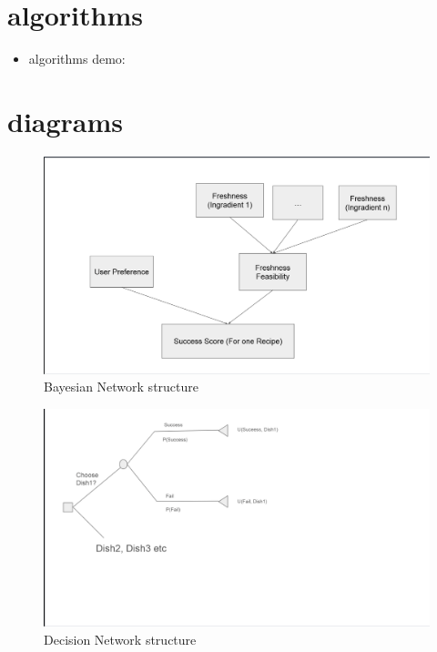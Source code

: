 \section{algorithms}
\begin{itemize}
    \item algorithms demo: 
\end{itemize}
\newpage
\section{diagrams}

\begin{figure}[ht]
    \centering
    \includegraphics[width=1.0\textwidth]{appendix/Image/BN.png}
    \caption{Bayesian Network structure}
    \label{fig:BN}
\end{figure}

\begin{figure}[ht]
    \centering
    \includegraphics[width=1.0\textwidth]{appendix/Image/Decision-Network.png}
    \caption{Decision Network structure}
    \label{fig:DN}
\end{figure}